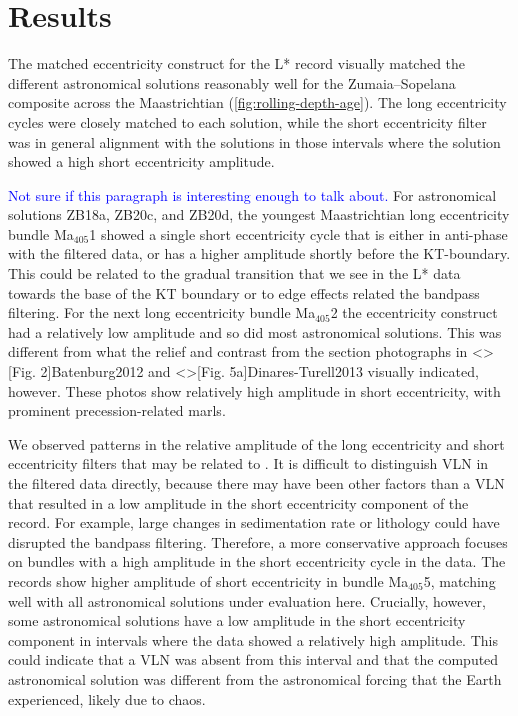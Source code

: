 \documentclass[draft]{agujournal2019}
\newcommand{\ma}[1]{Ma\(_{405}\)#1} %
\newcommand{\ijk}{\textcolor{blue}}
\begin{document}
\section{Results}\label{sec:results}

The matched eccentricity construct for the \gls{L*} record visually matched the different astronomical solutions reasonably well for the Zumaia--Sopelana composite across the Maastrichtian (\cref{fig:rolling-depth-age}). %
The long eccentricity cycles were closely matched to each solution, while the short eccentricity filter was in general alignment with the solutions in those intervals where the solution showed a high short eccentricity amplitude.

\ijk{Not sure if this paragraph is interesting enough to talk about.}
For astronomical solutions ZB18a, ZB20c, and ZB20d, the youngest Maastrichtian long eccentricity bundle \ma{1} showed a single short eccentricity cycle that is either in anti-phase with the filtered data, or has a higher amplitude shortly before the \gls{KT}-boundary.
This could be related to the gradual transition that we see in the \gls{L*} data towards the base of the \gls{KT} boundary or to edge effects related the bandpass filtering.
For the next long eccentricity bundle \ma{2} the eccentricity construct had a relatively low amplitude and so did most astronomical solutions.
This was different from what the relief and contrast from the section photographs in \citeA<>[Fig. 2]{Batenburg2012} and \citeA<>[Fig. 5a]{Dinares-Turell2013} visually indicated, however.
These photos show relatively high amplitude in short eccentricity, with prominent precession-related marls.

We observed patterns in the relative amplitude of the long eccentricity and short eccentricity filters that may be related to .
It is difficult to distinguish \gls{VLN} in the filtered data directly, because there may have been other factors than a \gls{VLN} that resulted in a low amplitude in the short eccentricity component of the record.
For example, large changes in sedimentation rate or lithology could have disrupted the bandpass filtering.
Therefore, a more conservative approach focuses on bundles with a high amplitude in the short eccentricity cycle in the data.
The records show higher amplitude of short eccentricity in bundle \ma{5}, matching well with all astronomical solutions under evaluation here.
Crucially, however, some astronomical solutions have a low amplitude in the short eccentricity component in intervals where the data showed a relatively high amplitude.
This could indicate that a \gls{VLN} was absent from this interval and that the computed astronomical solution was different from the astronomical forcing that the Earth experienced, likely due to chaos.
\end{document}
